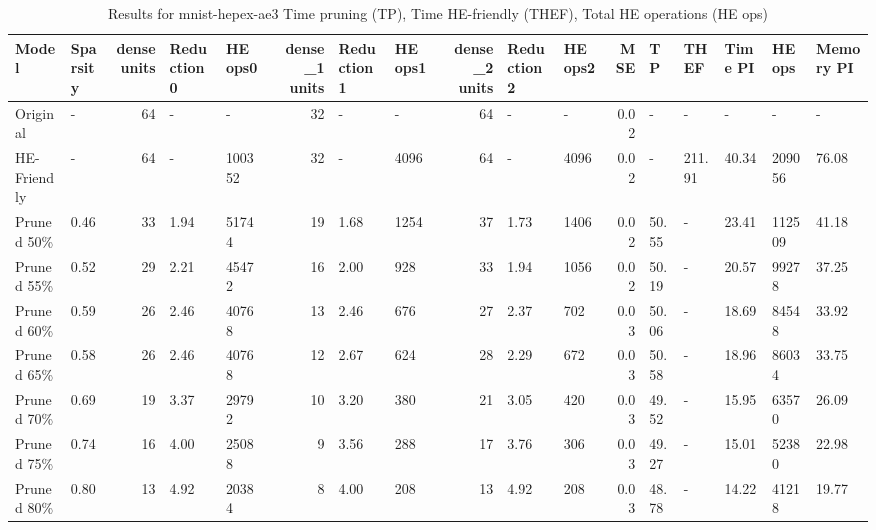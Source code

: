 \begin{table}
\centering
\caption{Results for mnist-hepex-ae3  Time pruning (TP), Time HE-friendly (THEF), Total HE operations (HE ops)}
\begin{tabular}{llrllrllrllrlllll}
\toprule
      Model & Sparsity &  dense units & Reduction0 & HE ops0 &  dense\_1 units & Reduction1 & HE ops1 &  dense\_2 units & Reduction2 & HE ops2 &  MSE &    TP &   THEF & Time PI & HE ops & Memory PI \\
\midrule
   Original &        - &           64 &          - &       - &             32 &          - &       - &             64 &          - &       - & 0.02 &     - &      - &       - &      - &         - \\
HE-Friendly &        - &           64 &          - &  100352 &             32 &          - &    4096 &             64 &          - &    4096 & 0.02 &     - & 211.91 &   40.34 & 209056 &     76.08 \\
 Pruned 50\% &     0.46 &           33 &       1.94 &   51744 &             19 &       1.68 &    1254 &             37 &       1.73 &    1406 & 0.02 & 50.55 &      - &   23.41 & 112509 &     41.18 \\
 Pruned 55\% &     0.52 &           29 &       2.21 &   45472 &             16 &       2.00 &     928 &             33 &       1.94 &    1056 & 0.02 & 50.19 &      - &   20.57 &  99278 &     37.25 \\
 Pruned 60\% &     0.59 &           26 &       2.46 &   40768 &             13 &       2.46 &     676 &             27 &       2.37 &     702 & 0.03 & 50.06 &      - &   18.69 &  84548 &     33.92 \\
 Pruned 65\% &     0.58 &           26 &       2.46 &   40768 &             12 &       2.67 &     624 &             28 &       2.29 &     672 & 0.03 & 50.58 &      - &   18.96 &  86034 &     33.75 \\
 Pruned 70\% &     0.69 &           19 &       3.37 &   29792 &             10 &       3.20 &     380 &             21 &       3.05 &     420 & 0.03 & 49.52 &      - &   15.95 &  63570 &     26.09 \\
 Pruned 75\% &     0.74 &           16 &       4.00 &   25088 &              9 &       3.56 &     288 &             17 &       3.76 &     306 & 0.03 & 49.27 &      - &   15.01 &  52380 &     22.98 \\
 Pruned 80\% &     0.80 &           13 &       4.92 &   20384 &              8 &       4.00 &     208 &             13 &       4.92 &     208 & 0.03 & 48.78 &      - &   14.22 &  41218 &     19.77 \\

\end{tabular}
\end{table}
